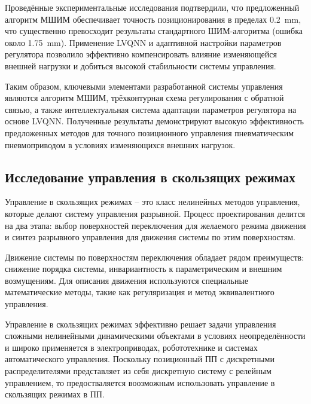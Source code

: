 Проведённые экспериментальные исследования подтвердили, что предложенный алгоритм МШИМ обеспечивает точность позиционирования
в пределах \num{0.2}~\si{\milli\metre}, что существенно превосходит результаты стандартного ШИМ-алгоритма (ошибка около \num{1.75}~\si{\milli\metre}). Применение
LVQNN и адаптивной настройки параметров регулятора позволило эффективно компенсировать влияние изменяющейся внешней нагрузки и
добиться высокой стабильности системы управления.

Таким образом, ключевыми элементами разработанной системы управления являются алгоритм МШИМ,
трёхконтурная схема регулирования с обратной связью, а также интеллектуальная система адаптации параметров
регулятора на основе LVQNN. Полученные результаты демонстрируют высокую эффективность предложенных методов для точного
позиционного управления пневматическим пневмоприводом в условиях изменяющихся внешних нагрузок.



\subsection{Исследование управления в скользящих режимах}\label{subsec:ch1/sec5/subsec2}

Управление в скользящих режимах \cite*{utkin2017sliding} -- это класс нелинейных методов управления, которые делают систему управления разрывной.
Процесс проектирования делится на два этапа: выбор поверхностей переключения для желаемого режима движения и синтез разрывного
управления для движения системы по этим поверхностям.

Движение системы по поверхностям переключения обладает рядом преимуществ: снижение порядка системы, инвариантность
к параметрическим и внешним возмущениям. Для описания движения используются специальные математические методы, такие
как регуляризация и метод эквивалентного управления.

Управление в скользящих режимах эффективно решает задачи управления сложными нелинейными динамическими объектами в
условиях неопределённости и широко применяется в электроприводах, робототехнике и системах автоматического управления.
Поскольку позиционный ПП с дискретными распределителями представляет из себя дискретную систему с релейным
управлением, то предостваляется воозможным использовать управление в скользящих режимах в ПП.

